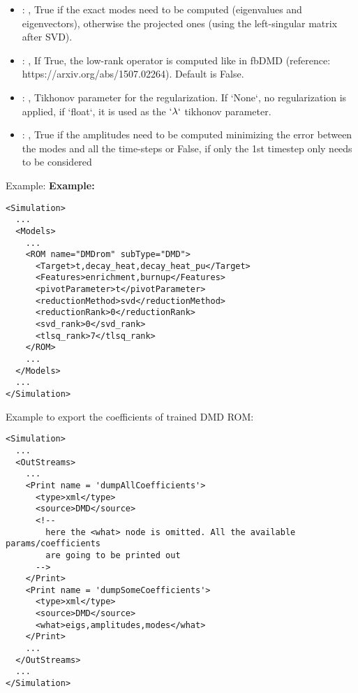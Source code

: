 \begin{itemize}
    \item {}: , 
      True if the exact modes need to be computed (eigenvalues and
      eigenvectors),   otherwise the projected ones (using the left-singular matrix after SVD).

    \item {}: , 
      If True, the low-rank operator is computed like in fbDMD (reference:
      https://arxiv.org/abs/1507.02264).                                                  Default is
      False.

    \item {}: , 
      Tikhonov parameter for the regularization.                                                  If
      `None`, no regularization is applied, if `float`, it is used as the
      $`\lambda`$ tikhonov parameter.

    \item {}: , 
      True if the amplitudes need to be computed minimizing the error
      between the modes and all the time-steps or False, if only the 1st timestep only needs to be
      considered
  \end{itemize}

\hspace{24pt}
Example:
\textbf{Example:}
\begin{lstlisting}[style=XML,morekeywords={name,subType}]
<Simulation>
  ...
  <Models>
    ...
    <ROM name="DMDrom" subType="DMD">
      <Target>t,decay_heat,decay_heat_pu</Target>
      <Features>enrichment,burnup</Features>
      <pivotParameter>t</pivotParameter>
      <reductionMethod>svd</reductionMethod>
      <reductionRank>0</reductionRank>
      <svd_rank>0</svd_rank>
      <tlsq_rank>7</tlsq_rank>
    </ROM>
    ...
  </Models>
  ...
</Simulation>
\end{lstlisting}

Example to export the coefficients of trained DMD ROM:
\begin{lstlisting}[style=XML,morekeywords={name,subType}]
<Simulation>
  ...
  <OutStreams>
    ...
    <Print name = 'dumpAllCoefficients'>
      <type>xml</type>
      <source>DMD</source>
      <!--
        here the <what> node is omitted. All the available params/coefficients
        are going to be printed out
      -->
    </Print>
    <Print name = 'dumpSomeCoefficients'>
      <type>xml</type>
      <source>DMD</source>
      <what>eigs,amplitudes,modes</what>
    </Print>
    ...
  </OutStreams>
  ...
</Simulation>
\end{lstlisting}


